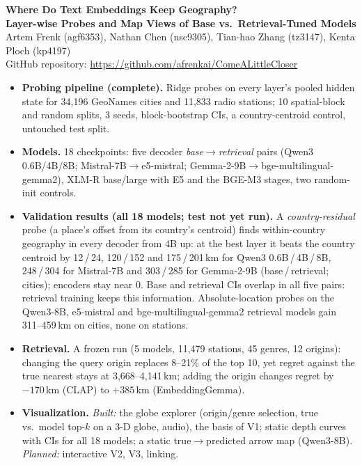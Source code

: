 \documentclass[10pt]{article}
\newcommand{\head}[1]{\par\vspace{3pt}{\large\bfseries #1}\par\vspace{1pt}}
\begin{document}
\small

\begin{center}
{\Large\bfseries Where Do Text Embeddings Keep Geography?\\Layer-wise Probes and Map Views of Base vs.\ Retrieval-Tuned Models}\\[2pt]
Artem Frenk (agf6353), Nathan Chen (nsc9305), Tian-hao Zhang (tz3147), Kenta Ploch (kp4197)\\
GitHub repository: \url{https://github.com/afrenkai/ComeALittleCloser}
\end{center}

\head{Progress since the proposal}
\begin{itemize}
\item \textbf{Probing pipeline (complete).} Ridge probes on every layer's pooled hidden state for 34,196 GeoNames cities and 11,833 radio stations; 10\textdegree{} spatial-block and random splits, 3 seeds, block-bootstrap CIs, a country-centroid control, untouched test split.
\item \textbf{Models.} 18 checkpoints: five decoder \emph{base$\to$retrieval} pairs (Qwen3 0.6B/4B/8B; Mistral-7B$\to$e5-mistral; Gemma-2-9B$\to$bge-multilingual-gemma2), XLM-R base/large with E5 and the BGE-M3 stages, two random-init controls.
\item \textbf{Validation results (all 18 models; test not yet run).} A \emph{country-residual} probe (a place's offset from its country's centroid) finds within-country geography in every decoder from 4B up: at the best layer it beats the country centroid by 12\,/\,24, 120\,/\,152 and 175\,/\,201\,km for Qwen3 0.6B\,/\,4B\,/\,8B, 248\,/\,304 for Mistral-7B and 303\,/\,285 for Gemma-2-9B (base\,/\,retrieval; cities); encoders stay near 0. Base and retrieval CIs overlap in all five pairs: retrieval training keeps this information. Absolute-location probes on the Qwen3-8B, e5-mistral and bge-multilingual-gemma2 retrieval models gain 311--459\,km on cities, none on stations.
\item \textbf{Retrieval.} A frozen run (5 models, 11,479 stations, 45 genres, 12 origins): changing the query origin replaces 8--21\% of the top 10, yet regret against the true nearest stays at 3,668--4,141\,km; adding the origin changes regret by $-170$\,km (CLAP) to $+385$\,km (EmbeddingGemma).
\item \textbf{Visualization.} \emph{Built:} the globe explorer (origin/genre selection, true vs.\ model top-$k$ on a 3-D globe, audio), the basis of V1; static depth curves with CIs for all 18 models; a static true$\to$predicted arrow map (Qwen3-8B). \emph{Planned:} interactive V2, V3, linking.
\end{itemize}
\end{document}
